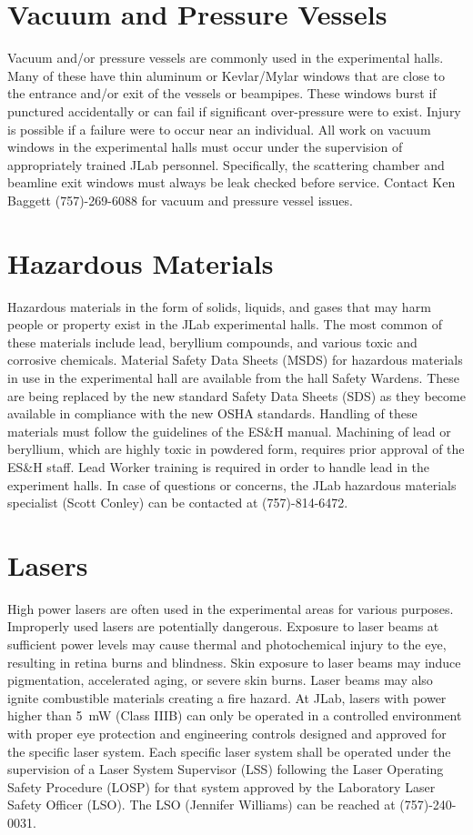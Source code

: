 \documentclass[12pt]{report}
\begin{document}
\section{Vacuum and Pressure Vessels}

Vacuum and/or pressure vessels are commonly used in the experimental halls. Many 
of these have thin aluminum or Kevlar/Mylar windows that are close to the entrance 
and/or exit of the vessels or beampipes. These windows burst if punctured accidentally 
or can fail if significant over-pressure were to exist. Injury is possible if a failure 
were to occur near an individual. All work on vacuum windows in the experimental halls 
must occur under the supervision of appropriately trained JLab personnel. Specifically, 
the scattering chamber and beamline exit windows must always be leak checked before 
service. Contact Ken Baggett (757)-269-6088 for vacuum and pressure vessel issues.

\section{Hazardous Materials}

Hazardous materials in the form of solids, liquids, and gases that may harm people or 
property exist in the JLab experimental halls. The most common of these materials 
include lead, beryllium compounds, and various toxic and corrosive chemicals. Material 
Safety Data Sheets (MSDS) for hazardous materials in use in the experimental hall are 
available from the hall Safety Wardens. These are being replaced by the new standard
Safety Data Sheets (SDS) as they become available in compliance with the new OSHA 
standards. Handling of these materials must follow the guidelines of the ES\&H manual. 
Machining of lead or beryllium, which are highly toxic in powdered form, requires prior 
approval of the ES\&H staff. Lead Worker training is required in order to handle lead in 
the experiment halls. In case of questions or concerns, the JLab hazardous materials 
specialist (Scott Conley) can be contacted at (757)-814-6472.

\section{Lasers}

High power lasers are often used in the experimental areas for various purposes. Improperly 
used lasers are potentially dangerous. Exposure to laser beams at sufficient power levels 
may cause thermal and photochemical injury to the eye, resulting in retina burns and 
blindness. Skin exposure to laser beams may induce pigmentation, accelerated aging, or 
severe skin burns. Laser beams may also ignite combustible materials creating a fire hazard. 
At JLab, lasers with power higher than 5~mW (Class IIIB) can only be operated in a controlled 
environment with proper eye protection and engineering controls designed and approved for the 
specific laser system. Each specific laser system shall be operated under the supervision of 
a Laser System Supervisor (LSS) following the Laser Operating Safety Procedure (LOSP) for 
that system approved by the Laboratory Laser Safety Officer (LSO). The LSO (Jennifer Williams)
can be reached at (757)-240-0031.
%
%
\end{document}
